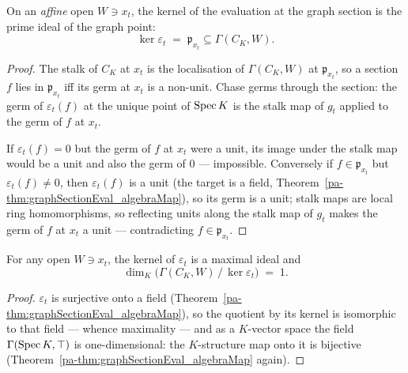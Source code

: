 \begin{theorem}
  \label{pa-thm:ker_graphSectionEval_eq_primeIdealOf}
  \leanok

  On an \emph{affine} open \(W \ni x_t\), the kernel of the evaluation at the graph section
  is the prime ideal of the graph point:
  \[
    \ker \varepsilon_t \;=\; \mathfrak p_{x_t} \subseteq \Gamma(C_K, W).
  \]
\end{theorem}
\begin{proof}
  \leanok
  The stalk of \(C_K\) at \(x_t\) is the localisation of \(\Gamma(C_K, W)\) at
  \(\mathfrak p_{x_t}\), so a section \(f\) lies in \(\mathfrak p_{x_t}\) iff its germ at
  \(x_t\) is a non-unit. Chase germs through the section: the germ of
  \(\varepsilon_t(f)\) at the unique point of \(\operatorname{Spec} K\) is the stalk map of \(g_t\)
  applied to the germ of \(f\) at \(x_t\).

  If \(\varepsilon_t(f) = 0\) but the germ of \(f\) at \(x_t\) were a unit, its image under
  the stalk map would be a unit and also the germ of \(0\) — impossible. Conversely if
  \(f \in \mathfrak p_{x_t}\) but \(\varepsilon_t(f) \neq 0\), then \(\varepsilon_t(f)\) is
  a unit (the target is a field, Theorem~\ref{pa-thm:graphSectionEval_algebraMap}), so its
  germ is a unit; stalk maps are local ring homomorphisms, so reflecting units along the
  stalk map of \(g_t\) makes the germ of \(f\) at \(x_t\) a unit — contradicting
  \(f \in \mathfrak p_{x_t}\).
\end{proof}

\begin{theorem}
  \label{pa-thm:finrank_quotient_ker_graphSectionEval}
  \leanok

  For any open \(W \ni x_t\), the kernel of \(\varepsilon_t\) is a maximal ideal and
  \[
    \dim_K \bigl(\Gamma(C_K, W) \,/\, \ker\varepsilon_t\bigr) \;=\; 1 .
  \]
\end{theorem}
\begin{proof}
  \leanok
  \(\varepsilon_t\) is surjective onto a field
  (Theorem~\ref{pa-thm:graphSectionEval_algebraMap}), so the quotient by its kernel is
  isomorphic to that field — whence maximality — and as a \(K\)-vector space the field
  \(\Gamma(\operatorname{Spec} K, \top)\) is one-dimensional: the \(K\)-structure map onto it is
  bijective (Theorem~\ref{pa-thm:graphSectionEval_algebraMap} again).
\end{proof}

